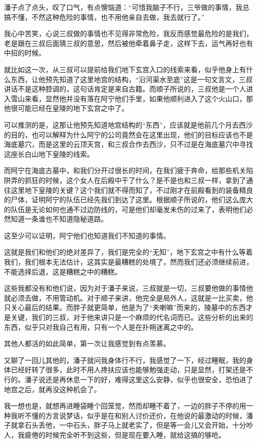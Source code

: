 潘子点了点头，叹了口气，有点懊恼道：“可惜我脑子不行，三爷做的事情，我总搞不懂，不然这种危险的事情，也不用他亲自去做，我去就行了。”

我心中苦笑，心说三叔做的事情也不见得非常危险，我反而感觉最危险的是我们，老是跟在三叔后面猜三叔的意思，然后被他牵着鼻子走，这样下去，运气再好也有中招的时候。

就比如这一次，从三叔可以提前给我们地下玄宫入口的线索来看，似乎他身上有什么东西，让他预先知道了这里地宫的结构，“沿河渠水至底”这是一句文言文，三叔讲话不是这种腔调的，这句话肯定是来自古籍。而顺子所说的，三叔他是一个人进入雪山来看，显然他并没有落在阿宁他们手里，如果他顺利进入了这个火山口，那他很可能已经在皇陵的地下玄宫之中了。

可以推测的是，这那让他预先知道地宫结构的“东西”，应该就是他前几个月去西沙的目的，也可以解释为什么阿宁的公司竟然会在这里出现，他们的目标应该也不是海底墓穴，而是这里的云顶天宫，和三叔合作去西沙，只不过是在海底墓穴中寻找这座长白山地下皇陵的线索。

而阿宁在海底古墓中，和我们分开过很长的时间，在我们疲于奔命，给那些机关陷阱弄的抓狂的时候，这个女人在后殿中干了什么？是不是也和三叔一样，拿到了通往这里地下皇陵的关键？这个我们就不得而知了，不过刚才在前殿看到的装备精良的尸体，证明阿宁的队伍已经先我们到达了这里。根据顺子所说的，他们这么庞大的队伍是无论如何也通不过边防线的，可是他们却毫发未伤的过来了，表明他们必然知道一条谁也不知道隐秘道路。

这至少可以证明，阿宁他们也知道我们不知道的事情。

这就是我们和他们的绝对差异了，我们是完全的“无知”，地下玄宫之中有什么等着我们，我们根本无法估计，这其实是最糟糕的处境了，然而我们还必须继续前进，不能选择后退，这是糟糕之中的糟糕。

这些我都没有和他们说，因为对于潘子来说，三叔就是一切，三叔要他做的事情他就必须去做，不用管动机。对于顺子来讲，他完全是局外人，这就是一比买卖，他只关心最后的结果。而胖子就更简单，他是为了“夹喇嘛”而来的，陵墓中的东西才是关键，我们的三叔，对于他来讲只是一个麻烦的代名词而已。这些分析的出来的东西，似乎只对我自己有用，只有一个人是在扑朔迷离之中的。

其他人都活的如此简单，第一次让我感觉到有点羡慕。

又聊了一回儿其他的，潘子就问我身体行不行，我感觉了一下，经过睡眠，我的身体已经好转了很多，此时不用人搀扶应该也能够勉强走动，只是显然，打架还是不行的。潘子说还是再休息一下的好，难得这里这么安静，似乎也很安全，恐怕进了地宫之后，就再没这种机会了。

我一想也是，就想再进睡袋睡个回笼觉，然而却睡不着了，一边的胖子不停的用一种我听不懂的方言说梦话，似乎是在和别人讨价还价，在他说的最激动的时候，潘子就拿石头丢他，一中石头，胖子马上就老实了，但是等一会儿又会开始，十分吵人，我疲倦的时候完全听不到这些，但是现在要入睡，就给这搞的够呛。

